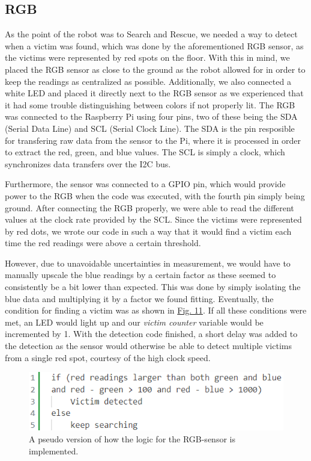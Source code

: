 \documentclass[conference]{IEEEtran}
\begin{document}
\subsection{RGB}
As the point of the robot was to Search and Rescue, we needed a way to detect when a victim was found, which was done by the aforementioned RGB sensor, as the victims were represented by red spots on the floor.
With this in mind, we placed the RGB sensor as close to the ground as the robot allowed for in order to keep the readings as centralized as possible.
Additionally, we also connected a white LED and placed it directly next to the RGB sensor as we experienced that it had some trouble distinguishing between colors if not properly lit.
The RGB was connected to the Raspberry Pi using four pins, two of these being the SDA (Serial Data Line) and SCL (Serial Clock Line)\cite{b4}. The SDA is the pin resposible for transfering raw data from the sensor to the Pi, where it is processed in order to extract the red, green, and blue values.
The SCL is simply a clock, which synchronizes data transfers over the I2C bus.

Furthermore, the sensor was connected to a GPIO pin, which would provide power to the RGB when the code was executed, with the fourth pin simply being ground.
After connecting the RGB properly, we were able to read the different values at the clock rate provided by the SCL.
Since the victims were represented by red dots, we wrote our code in such a way that it would find a victim each time the red readings were above a certain threshold.

However, due to unavoidable uncertainties in measurement, we would have to manually upscale the blue readings by a certain factor as these seemed to consistently be a bit lower than expected.
This was done by simply isolating the blue data and multiplying it by a factor we found fitting.
Eventually, the condition for finding a victim was as shown in \href{sec:rgb}{Fig. 11}.
If all these conditions were met, an LED would light up and our \textit{victim counter} variable would be incremented by 1.
With the detection code finished, a short delay was added to the detection as the sensor would otherwise be able to detect multiple victims from a single red spot, courtesy of the high clock speed.

\begin{figure}[htbp]
    \centerline{\includegraphics[width=1.0\columnwidth]{Pictures/rgbpseudo.png}}
    \caption{A pseudo version of how the logic for the RGB-sensor is implemented.}
    \label{sec:rgb}
    \end{figure}
\end{document}
